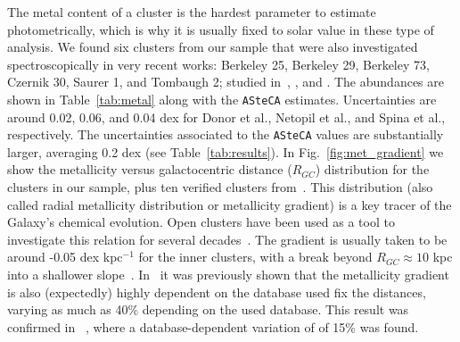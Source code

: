 \documentclass{aa}
\begin{document}
  The metal content of a cluster is the hardest parameter to estimate
  photometrically, which is why it is usually fixed to solar value in these
  type of analysis.
  We found six clusters from our sample that were also investigated
  spectroscopically in very recent works: Berkeley 25, Berkeley 29,
  Berkeley 73, Czernik 30, Saurer 1, and Tombaugh 2; studied
  in~\cite{Donor_2020}, \cite{Netopil_2022}, and \cite{Spina_2021}. The
  abundances are shown in Table~\ref{tab:metal} along with the \texttt{ASteCA}
  estimates. Uncertainties are around 0.02, 0.06, and 0.04 dex for Donor et
  al., Netopil et al., and Spina et al., respectively.
  The uncertainties associated to the \texttt{ASteCA} values are substantially
  larger, averaging 0.2 dex (see Table~\ref{tab:results}).
  In Fig.~\ref{fig:met_gradient} we show the metallicity versus
  galactocentric distance ($R_{GC}$) distribution for the clusters in our
  sample, plus ten verified clusters from~\cite{Perren_2020}.
  This distribution (also called radial metallicity distribution or
  metallicity gradient) is a key tracer of the Galaxy's chemical evolution.
  Open clusters have been used as a tool to investigate this relation for several
  decades~\citep{Janes_1979}. The gradient is usually taken to be around -0.05
  dex kpc$^{-1}$ for the inner clusters, with a break beyond $R_{GC}\approx10$
  kpc into a shallower slope~\citep{Donor_2020}. In~\cite{Donor_2018} it was
  previously shown that the metallicity gradient is also (expectedly) highly
  dependent on the database used fix the distances, varying as much as 40\%
  depending on the used database. This result was confirmed in~
  \cite{Donor_2020}, where a database-dependent variation of of 15\% was found.

\end{document}
